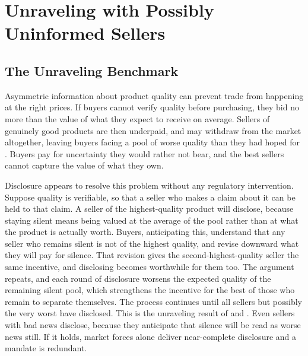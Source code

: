 %

\section{Unraveling with Possibly Uninformed Sellers}
\label{sec:unraveling}

\subsection{The Unraveling Benchmark}

Asymmetric information about product quality can prevent trade from happening at the right
prices. If buyers cannot verify quality before purchasing, they bid no more than the value of
what they expect to receive on average. Sellers of genuinely good products are then underpaid,
and may withdraw from the market altogether, leaving buyers facing a pool of worse quality than
they had hoped for \citep{akerlof_lemons_1970}. Buyers pay for
uncertainty they would rather not bear, and the best sellers cannot capture the value of what
they own.

Disclosure appears to resolve this problem without any regulatory intervention. Suppose quality
is verifiable, so that a seller who makes a claim about it can be held to that claim. A seller
of the highest-quality product will disclose, because staying silent means being valued at the
average of the pool rather than at what the product is actually worth. Buyers, anticipating
this, understand that any seller who remains silent is not of the highest quality, and revise
downward what they will pay for silence. That revision gives the second-highest-quality seller
the same incentive, and disclosing becomes worthwhile for them too. The argument repeats, and each
round of disclosure worsens the expected quality of the remaining silent pool, which strengthens
the incentive for the best of those who remain to separate themselves. The process continues
until all sellers but possibly the very worst have disclosed. This is the unraveling result of
\citet{grossman_informational_1981} and \citet{milgrom_good_1981}. Even sellers with bad news
disclose, because they anticipate that silence will be read as worse news still. If it holds,
market forces alone deliver near-complete disclosure and a mandate is redundant.

